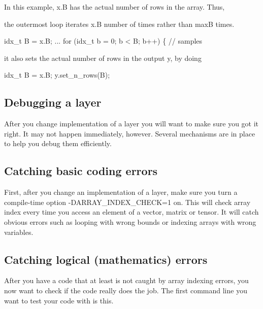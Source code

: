 In this example, x.\+B has the actual number of rows in the array. Thus,
\begin{DoxyItemize}
\item the outermost loop iterates x.\+B number of times rather than maxB times. 
\begin{DoxyCode}
idx\_t B = x.B;
 ...
for (idx\_t b = 0; b < B; b++) \{       // samples
\end{DoxyCode}

\item it also sets the actual number of rows in the output y, by doing 
\begin{DoxyCode}
idx\_t B = x.B;
y.set\_n\_rows(B);
\end{DoxyCode}

\end{DoxyItemize}

\subsection*{Debugging a layer }

After you change implementation of a layer you will want to make sure you got it right. It may not happen immediately, however. Several mechanisms are in place to help you debug them efficiently.

\subsection*{Catching basic coding errors }

First, after you change an implementation of a layer, make sure you turn a compile-\/time option -\/\+D\+A\+R\+R\+A\+Y\+\_\+\+I\+N\+D\+E\+X\+\_\+\+C\+H\+E\+CK=1 on. This will check array index every time you access an element of a vector, matrix or tensor. It will catch obvious errors such as looping with wrong bounds or indexing arrays with wrong variables.




\subsection*{Catching logical (mathematics) errors }

After you have a code that at least is not caught by array indexing errors, you now want to check if the code really does the job. The first command line you want to test your code with is this.


